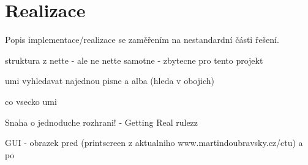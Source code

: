 \chapter{Realizace}
\label{chapter:implementation}
Popis implementace/realizace se zaměřením na nestandardní části řešení.

struktura z nette - ale ne nette samotne - zbytecne pro tento projekt

umi vyhledavat najednou pisne a alba (hleda v obojich)

co vsecko umi

Snaha o jednoduche rozhrani! - Getting Real rulezz

GUI - obrazek pred (printscreen z aktualniho www.martindoubravsky.cz/ctu) a po